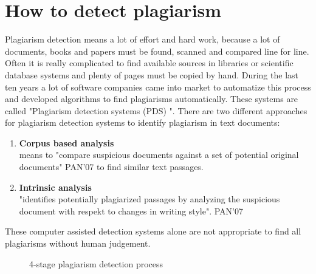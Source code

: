 \section{How to detect plagiarism}
Plagiarism detection means a lot of effort and hard work, because a lot of documents, books and papers must be found, scanned and compared line for line. Often it is really complicated to find available sources in libraries or scientific database systems and plenty of pages must be copied by hand. 
During the last ten years a lot of software companies came into market to automatize this process and developed algorithms to find plagiarisms automatically. These systems are called "Plagiarism detection systems (PDS) ". 
There are two different approaches for plagiarism detection systems to identify plagiarism in text documents:
\begin{enumerate}
\item \textbf{Corpus based analysis}\\
means to "compare suspicious documents against a set of potential original documents" PAN'07
to find similar text passages.
\item \textbf{Intrinsic analysis}\\
"identifies potentially plagiarized passages by analyzing the suspicious document with respekt to changes in writing style". PAN'07
\end{enumerate}
These computer assisted detection systems alone are not appropriate to find all plagiarisms without human judgement.  

 \begin{figure}[!h]
  \centering
  \caption{4-stage plagiarism detection process}
  \label{fig:4-stage plagiarism detection process}
\end{figure}

